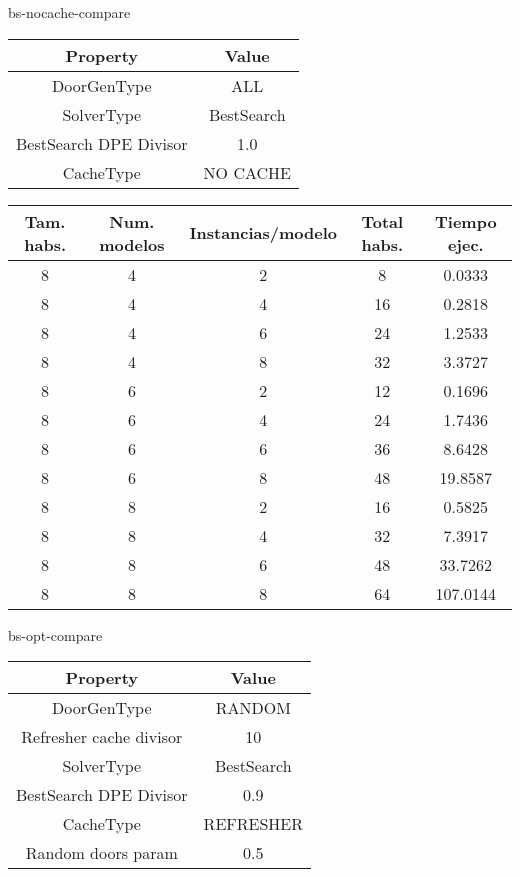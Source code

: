 bs-nocache-compare
\begin{center}
	\begin{tabular}{ | c | c | }
\hline
 		Property & Value \\ \hline
DoorGenType & ALL \\ 
SolverType & BestSearch \\ 
BestSearch DPE Divisor & 1.0 \\ 
CacheType & NO CACHE \\ 
\hline
	\end{tabular}
\end{center}

\begin{center}
	\begin{tabular}{ | c | c | c | c | c | }
\hline
Tam. habs. & Num. modelos & Instancias/modelo & Total habs. & Tiempo ejec. \\ \hline 
8 & 4 & 2 & 8 & 0.0333 \\ 
8 & 4 & 4 & 16 & 0.2818 \\ 
8 & 4 & 6 & 24 & 1.2533 \\ 
8 & 4 & 8 & 32 & 3.3727 \\ 
8 & 6 & 2 & 12 & 0.1696 \\ 
8 & 6 & 4 & 24 & 1.7436 \\ 
8 & 6 & 6 & 36 & 8.6428 \\ 
8 & 6 & 8 & 48 & 19.8587 \\ 
8 & 8 & 2 & 16 & 0.5825 \\ 
8 & 8 & 4 & 32 & 7.3917 \\ 
8 & 8 & 6 & 48 & 33.7262 \\ 
8 & 8 & 8 & 64 & 107.0144 \\ 
\hline
	\end{tabular}
\end{center}

bs-opt-compare
\begin{center}
	\begin{tabular}{ | c | c | }
\hline
 		Property & Value \\ \hline
DoorGenType & RANDOM \\ 
Refresher cache divisor & 10 \\ 
SolverType & BestSearch \\ 
BestSearch DPE Divisor & 0.9 \\ 
CacheType & REFRESHER \\ 
Random doors param & 0.5 \\ 
\hline
	\end{tabular}
\end{center}

